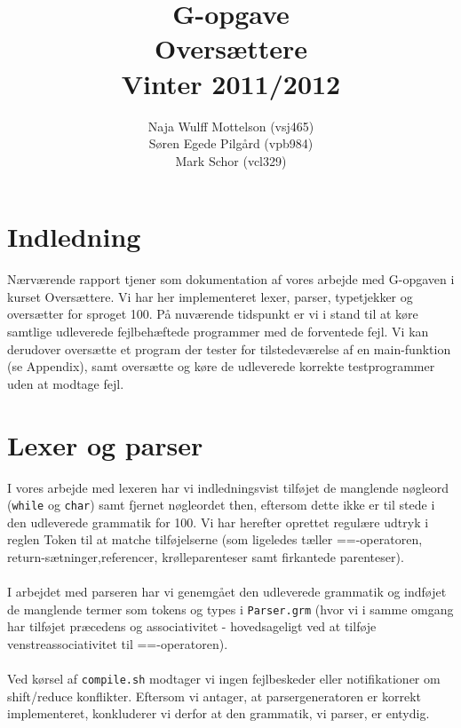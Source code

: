 \documentclass[10pt,a4paper,danish]{article}
\title{G-opgave \\Oversættere\\Vinter 2011/2012}
\author{Naja Wulff Mottelson (vsj465) \\
        Søren Egede Pilgård (vpb984) \\
        Mark Schor (vcl329)}
\begin{document}
\maketitle
\newpage

\tableofcontents
\newpage

\section{Indledning}
Nærværende rapport tjener som dokumentation af vores arbejde med G-opgaven
i kurset Oversættere. Vi har her implementeret lexer, parser, typetjekker og
oversætter for sproget 100. På nuværende tidspunkt er vi i stand til at 
køre samtlige udleverede fejlbehæftede programmer med de forventede fejl. 
Vi kan derudover oversætte et program der tester for tilstedeværelse af 
en main-funktion (se Appendix), samt oversætte
og køre de udleverede korrekte testprogrammer uden at modtage fejl. 

\section{Lexer og parser}
I vores arbejde med lexeren har vi indledningsvist tilføjet de manglende
nøgleord (\texttt{while} og \texttt{char}) samt fjernet nøgleordet then, eftersom
dette ikke er 
til stede i den udleverede 
grammatik for 100. Vi har herefter oprettet
regulære udtryk i reglen Token  til at matche tilføjelserne (som ligeledes
tæller ==-operatoren, return-sætninger,referencer, krølleparenteser samt
firkantede parenteser). 

\paragraph{}
I arbejdet med parseren har vi genemgået den udleverede grammatik 
og indføjet de manglende termer som tokens og types i \texttt{Parser.grm}
(hvor vi i samme omgang har tilføjet præcedens og associativitet - 
hovedsageligt ved at tilføje venstreassociativitet 
til ==-operatoren).

\paragraph{}
Ved kørsel af \texttt{compile.sh} modtager vi ingen fejlbeskeder eller 
notifikationer om shift/reduce konflikter. Eftersom vi antager, at 
parsergeneratoren er korrekt implementeret, konkluderer vi derfor at den 
grammatik, vi parser, er entydig. 
\end{document}
